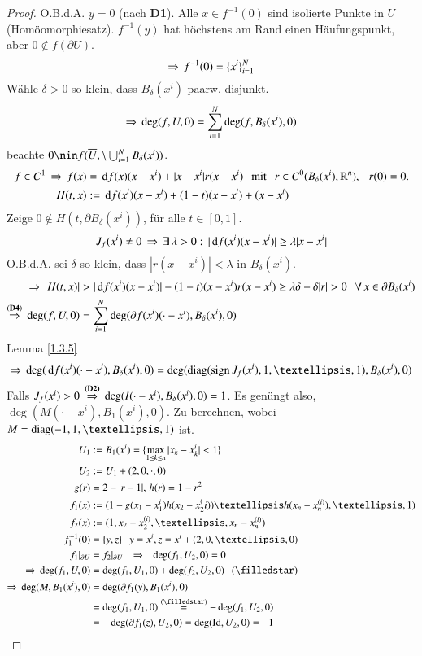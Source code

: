 \begin{proof}
    O.B.d.A. $y=0$ (nach \textbf{D1}). Alle $x\in f^{-1} (0)$ sind isolierte Punkte in $U$
    (Homöomorphiesatz).
    $f^{-1}(y)$ hat höchstens am Rand einen Häufungspunkt, aber $0\nin f(\partial U)$.
    \[
        \Rightarrow \, f^{-1}(0)= \{ x^i \}_{i=1}^N
    \]
    Wähle $\delta >0$ so klein, dass $B_\delta(x^i)$ paarw. disjunkt.
    \[
        \Rightarrow \, \deg(f,U,0)=\sum_{i=1}^N \deg(f,B_\delta(x^i),0)
    \]
    beachte $0\nin f(\ol U, \setminus \bigcup_{i=1}^N B_\delta(x^i))$.
    \begin{align*}
        f\in C^1 \, \Rightarrow \, f(x)&= \, \mathrm{d} f(x)(x-x^i) + |x-x^i| r(x-x^i) \hspace{.25cm} \text{mit} \hspace{.25cm} r\in C^0(B_\delta(x^i),\mathbb{R}^n), 
        \hspace{.25cm} r(0)=0.\\
           H(t,x) &:= \, \mathrm{d} f (x^i) (x-x^i)+ (1-t) (x-x^i)+(x-x^i)
    \end{align*}
    Zeige $0\nin H(t,\partial B_\delta(x^i))$, für alle $t\in [0,1]$.
    \[
        J_f(x^i)\neq 0 \, \Rightarrow \, \exists\, \lambda >0:\, |\, \mathrm{d} f(x^i)(x-x^i)|\geq \lambda|x-x^i|
    \]
    O.B.d.A. sei $\delta$ so klein, dass $|r(x-x^i)|<\lambda$ in $B_\delta (x^i)$.
    \begin{align*}
        \Ra\, | H(t,x) |&>|\d f(x^i)(x-x^i)|-(1-t)(x-x^i)r(x-x^i)\geq \lambda \delta - \delta|r|>0
        \qq \forall \, x\in \partial B_\delta (x^i)\\
        \overset{(\textbf{D4})}{\Ra} \, \deg(f,U,0)&=\sum_{i=1}^N\deg (\partial f (x^i)(\cdot-x^i),
                B_\delta(x^i),0)
    \end{align*}
    Lemma \ref{1.3.5}
    \[
        \Ra \, \deg(\d f (x^i)(\cdot- x^i),B_\delta (x^i),0)= \deg(\diag(\sign J_f(x^i),1,…,1),
            B_\delta(x^i),0)
    \]
    Falls $J_f(x^i)>0\, \overset{\textbf{(D2)}}{\Rightarrow}\,\deg(I(\cdot-x^i),B_\delta (x^i),0)=1$. Es genüngt
    also, $\deg(M(\cdot-x^i),B_1(x^i),0)$. Zu berechnen, wobei $M=\diag(-1,1,…,1)$ ist.
    \begin{align*}
        U_1&:= B_1 (x^i) = \{ \max_{1\leq k\leq n} |x_k-x_k^i|<1 \}\\
        U_2&:= U_1+ (2,0,\cdot,0)\\
        g(r)&=2-|r-1|, \, h(r)=1-r^2\\
        f_1(x)&:= (1-g(x_1-x_1^i)h(x_2-x_2^(i))…h(x_n-x_n^{(i)}),…, 1)\\
        f_2(x)&:= (1,x_2-x_2^{(i)}, … , x_n-x_n^{(i)})\\
        f_1^{-1}(0)&= \{ y,z \} \qq y=x^i, z = x^i+(2,0,…,0)\\
        f_1|_{\partial U}&= f_2|_{\partial U} \qq \Ra \qq \deg(f_1,U_2,0)=0\\
        \Ra \, \deg (f_1,U,0)&= \deg(f_1,U_1,0)+ \deg(f_2,U_2,0) \qq (\star)\\
        \Ra \, \deg(M,B_1(x^i),0)&=\deg(\partial f_1(y),B_1(x^i), 0)\\
        &=\deg(f_1, U_1,0) \overset{(\star)}{=} -\deg (f_1,U_2,0)\\
        &= -\deg(\partial f_1(z),U_2,0)=\deg(\Id, U_2,0)=-1
    \end{align*}
    \[ \]
\end{proof}
